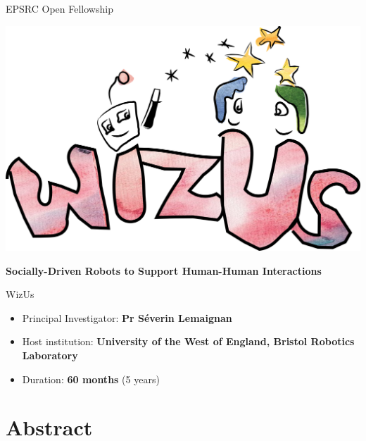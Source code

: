 \documentclass[11pt,a4paper]{report}
\title{\project}
\newcommand{\project}{WizUs\xspace}
\newcommand{\eu}[1]{}
\begin{document}
\maketitle

\begin{center}
    EPSRC Open Fellowship

    \vspace{2cm}
    \includegraphics[width=0.7\linewidth]{logo.png}

    \textbf{\LARGE Socially-Driven Robots to Support Human-Human Interactions}

    \vspace{2cm}
    {\Huge \project}

\end{center}

    \vspace{1cm}

\begin{itemize}
    \item Principal Investigator: \textbf{Pr Séverin Lemaignan}
    \item Host institution: \textbf{University of the West of England, Bristol Robotics
        Laboratory}
    \item Duration: \textbf{60 months} (5 years)
\end{itemize}

\section*{Abstract}\label{abstract}

\eu{The abstract (summary) should, at a glance, provide the reader with a clear
understanding of the objectives of the research proposal and how they will be
achieved. The abstract will be used as the short description of your research
proposal in the evaluation process and in communications to contact in
particular the potential remote referees and/or inform the Commission and/or the
programme management committees and/or relevant national funding agencies
(provided you give permission to do so where requested in the online proposal
submission forms, section 1). It must therefore be short and precise and should
not contain confidential information. \\
Please use plain typed text, avoiding formulae and other special characters. The
abstract must be written in English. There is a limit of 2000 characters (spaces
and line breaks included).}
\end{document}
